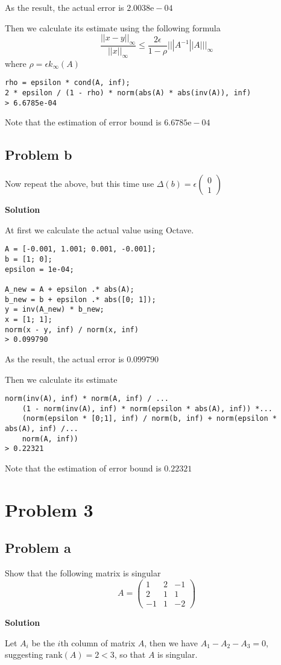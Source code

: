 \documentclass[12pt,oneside,a4paper]{article}
\newcommand{\problem}[1]
{
    \clearpage
    \section*{Problem {#1}}
}
\newcommand{\subproblem}[1]
{
    \subsection*{Problem {#1}}
}
\newcommand{\solution}
{
    \vspace{15pt}
    \noindent\ignorespaces\textbf{\large Solution}\par
}
\begin{document}
As the result, the actual error is $2.0038\mathrm{e}-04$

Then we calculate its estimate using the following formula
$$\frac{||x-y||_{\infty}}{||x||_{\infty}} \leq \frac{2\epsilon}{1 - \rho}|||A^{-1}||A|||_{\infty}$$
where $\rho = \epsilon k_{\infty}(A)$

\begin{verbatim}
rho = epsilon * cond(A, inf);
2 * epsilon / (1 - rho) * norm(abs(A) * abs(inv(A)), inf)
> 6.6785e-04
\end{verbatim}

Note that the estimation of error bound is $6.6785\mathrm{e}-04$

\subproblem{b}
Now repeat the above, but this time use $\Delta(b) = \epsilon \begin{pmatrix}
0\\
1
\end{pmatrix}$

\solution
At first we calculate the actual value using Octave.

\begin{verbatim}
A = [-0.001, 1.001; 0.001, -0.001];
b = [1; 0];
epsilon = 1e-04;

A_new = A + epsilon .* abs(A);
b_new = b + epsilon .* abs([0; 1]);
y = inv(A_new) * b_new;
x = [1; 1];
norm(x - y, inf) / norm(x, inf)
> 0.099790
\end{verbatim}

As the result, the actual error is $0.099790$ \par

Then we calculate its estimate

\begin{verbatim}
norm(inv(A), inf) * norm(A, inf) / ...
	(1 - norm(inv(A), inf) * norm(epsilon * abs(A), inf)) *...
	(norm(epsilon * [0;1], inf) / norm(b, inf) + norm(epsilon * abs(A), inf) /...
	norm(A, inf))
> 0.22321
\end{verbatim}

Note that the estimation of error bound is $0.22321$

\problem{3}
\subproblem{a}
Show that the following matrix is singular
$$A = \begin{pmatrix}
1&2&-1\\
2&1&1\\
-1&1&-2
\end{pmatrix}$$

\solution
Let $A_{i}$ be the $i$th column of matrix $A$, then we have $A_{1} - A_{2} - A_{3} = 0$, suggesting $\mathrm{rank}(A) = 2 < 3$, so that $A$ is singular.
\end{document}
